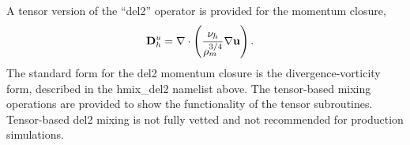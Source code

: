 A tensor version of the ``del2'' operator is provided for the momentum closure,
\begin{eqnarray}
\label{ocean:\mode_h_mom_del2_tensor}
& {\bf D}^u_h = \nabla\cdot\left( 
   \displaystyle\frac{\nu_h}{\rho_m^{3/4}} \nabla {\bf u}  \right).
\end{eqnarray}
The standard form for the del2 momentum closure is the divergence-vorticity form, described in the hmix\_del2 namelist above.  The tensor-based mixing operations are provided to show the functionality of the tensor subroutines.  Tensor-based del2 mixing is not fully vetted and not recommended for production simulations.
